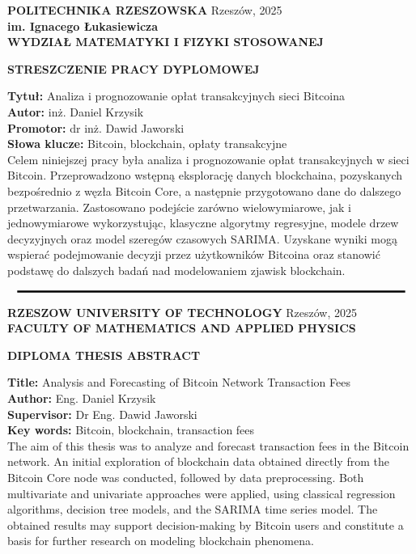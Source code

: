 \thispagestyle{empty}
\setlength{\parindent}{0in}
\setlength{\parskip}{0em}

\textbf{POLITECHNIKA RZESZOWSKA} \hfill Rzeszów, 2025 \\
\textbf{im. Ignacego Łukasiewicza} \\
\textbf{WYDZIAŁ MATEMATYKI I FIZYKI STOSOWANEJ} \\

\begin{center}
	\textbf{STRESZCZENIE  PRACY  DYPLOMOWEJ }
\end{center}

\textbf{Tytuł:} Analiza i prognozowanie opłat transakcyjnych sieci Bitcoina \\
\textbf{Autor:} inż. Daniel Krzysik \\
\textbf{Promotor:} dr inż. Dawid Jaworski \\
\textbf{Słowa klucze:} Bitcoin, blockchain, opłaty transakcyjne\\

Celem niniejszej pracy była analiza i prognozowanie opłat transakcyjnych w sieci Bitcoin. Przeprowadzono wstępną eksplorację danych blockchaina, pozyskanych bezpośrednio z węzła Bitcoin Core, a następnie przygotowano dane do dalszego przetwarzania. Zastosowano podejście zarówno wielowymiarowe, jak i jednowymiarowe wykorzystując, klasyczne algorytmy regresyjne, modele drzew decyzyjnych oraz model szeregów czasowych SARIMA. Uzyskane wyniki mogą wspierać podejmowanie decyzji przez użytkowników Bitcoina oraz stanowić podstawę do dalszych badań nad modelowaniem zjawisk blockchain.


\vfill
$$\noindent\rule{\textwidth}{2pt}$$
\vfill

\textbf{RZESZOW UNIVERSITY OF TECHNOLOGY} \hfill Rzeszów, 2025 \\
\textbf{FACULTY OF MATHEMATICS AND APPLIED PHYSICS } \\

\begin{center}
	\textbf{DIPLOMA THESIS ABSTRACT}
\end{center}

\textbf{Title:} Analysis and Forecasting of Bitcoin Network Transaction Fees\\
\textbf{Author:} Eng. Daniel Krzysik \\
\textbf{Supervisor:}  Dr Eng. Dawid Jaworski \\
\textbf{Key words:} Bitcoin, blockchain, transaction fees\\

The aim of this thesis was to analyze and forecast transaction fees in the Bitcoin network. An initial exploration of blockchain data obtained directly from the Bitcoin Core node was conducted, followed by data preprocessing. Both multivariate and univariate approaches were applied, using classical regression algorithms, decision tree models, and the SARIMA time series model. The obtained results may support decision-making by Bitcoin users and constitute a basis for further research on modeling blockchain phenomena.